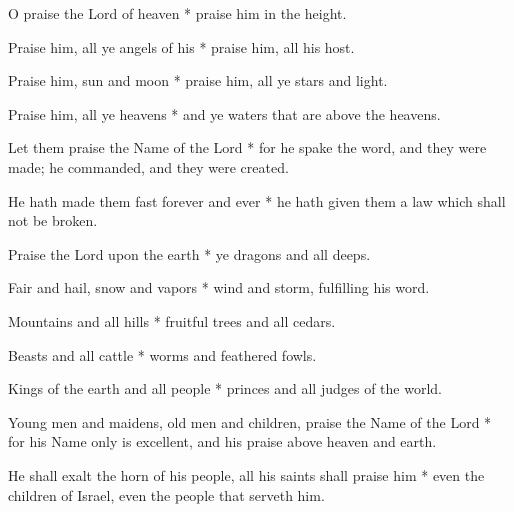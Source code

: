 \begin{multicols}{2}
	
	O praise the Lord of heaven * praise him in the height.
	
	Praise him, all ye angels of his * praise him, all his host.
	
	Praise him, sun and moon * praise him, all ye stars and light.
	
	Praise him, all ye heavens * and ye waters that are above the heavens.
	
	Let them praise the Name of the Lord * for he spake the word, and they were made; he commanded, and they were created.
	
	He hath made them fast forever and ever * he hath given them a law which shall not be broken.
	
	Praise the Lord upon the earth * ye dragons and all deeps.
	
	Fair and hail, snow and vapors * wind and storm, fulfilling his word.
	
	Mountains and all hills * fruitful trees and all cedars.
	
	Beasts and all cattle * worms and feathered fowls.
	
	Kings of the earth and all people * princes and all judges of the world.
	
	Young men and maidens, old men and children, praise the Name of the Lord * for his Name only is excellent, and his praise above heaven and earth.
	
	He shall exalt the horn of his people, all his saints shall praise him * even the children of Israel, even the people that serveth him.
	
	\gloria{}
\end{multicols}